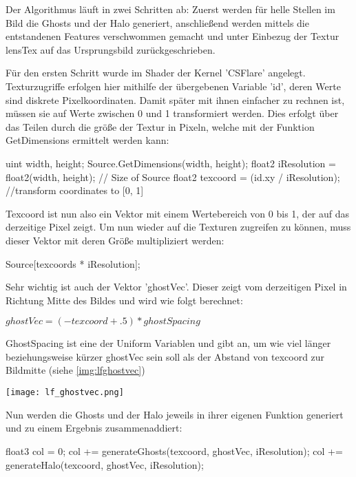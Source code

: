 Der Algorithmus läuft in zwei Schritten ab: Zuerst werden für helle Stellen im Bild die Ghosts und der Halo generiert, anschlie{\ss}end werden mittels  die entstandenen Features verschwommen gemacht und unter Einbezug der Textur lensTex auf das Ursprungsbild zurückgeschrieben.

Für den ersten Schritt wurde im Shader der Kernel 'CSFlare' angelegt. Texturzugriffe erfolgen hier mithilfe der übergebenen Variable 'id', deren Werte sind diskrete Pixelkoordinaten. Damit später mit ihnen einfacher zu rechnen ist, müssen sie auf Werte zwischen 0 und 1 transformiert werden. Dies erfolgt über das Teilen durch die grö{\ss}e der Textur in Pixeln, welche mit der Funktion GetDimensions ermittelt werden kann:

\begin{hlsl}
uint width, height;
Source.GetDimensions(width, height);
float2 iResolution = float2(width, height); // Size of Source
float2 texcoord = (id.xy / iResolution); //transform coordinates to [0, 1]
\end{hlsl}

Texcoord ist nun also ein Vektor mit einem Wertebereich von 0 bis 1, der auf das derzeitige Pixel zeigt. Um nun wieder auf die Texturen zugreifen zu können, muss dieser Vektor mit deren Grö{\ss}e multipliziert werden:

\begin{hlsl}
Source[texcoords * iResolution];
\end{hlsl}

Sehr wichtig ist auch der Vektor 'ghostVec'. Dieser zeigt vom derzeitigen Pixel in Richtung Mitte des Bildes und wird wie folgt berechnet:

$ghostVec = ( -texcoord + .5 ) * ghostSpacing$

GhostSpacing ist eine der Uniform Variablen und gibt an, um wie viel länger beziehungsweise kürzer ghostVec sein soll als der Abstand von texcoord zur Bildmitte (siehe \autoref{img:lfghostvec})

\captionsetup{type=figure}
\texttt{[image: lf\_ghostvec.png]}
\label{img:lfghostvec}

Nun werden die Ghosts und der Halo jeweils in ihrer eigenen Funktion generiert und zu einem Ergebnis zusammenaddiert:

\begin{hlsl}
float3 col = 0;
col += generateGhosts(texcoord, ghostVec, iResolution);
col += generateHalo(texcoord, ghostVec, iResolution);
\end{hlsl}


